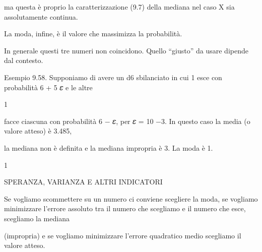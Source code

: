 \documentclass[a4paper,portrait,12pt]{article}
\begin{document}
\begin{flushleft}
ma questa \`{e} proprio la caratterizzazione (9.7) della mediana nel caso X sia assolutamente continua.
\end{flushleft}


\begin{flushleft}
La moda, infine, \`{e} il valore che massimizza la probabilit\`{a}.
\end{flushleft}


\begin{flushleft}
In generale questi tre numeri non coincidono. Quello {``}giusto'' da usare dipende dal contesto.
\end{flushleft}


\begin{flushleft}
Esempio 9.58. Supponiamo di avere un d6 sbilanciato in cui 1 esce con probabilit\`{a} 6 + 5 𝜀 e le altre
\end{flushleft}


1


\begin{flushleft}
facce ciascuna con probabilit\`{a} 6 $-$ 𝜀, per 𝜀 = 10 $-$3. In questo caso la media (o valore atteso) \`{e} 3.485,
\end{flushleft}


\begin{flushleft}
la mediana non \`{e} definita e la mediana impropria \`{e} 3. La moda \`{e} 1.
\end{flushleft}


1










\begin{flushleft}
SPERANZA, VARIANZA E ALTRI INDICATORI
\end{flushleft}





\begin{flushleft}
Se vogliamo scommettere su un numero ci conviene scegliere la moda, se vogliamo minimizzare l'errore assoluto tra il numero che scegliamo e il numero che esce, scegliamo la mediana
\end{flushleft}


\begin{flushleft}
(impropria) e se vogliamo minimizzare l'errore quadratico medio scegliamo il valore atteso.
\end{flushleft}
\end{document}
